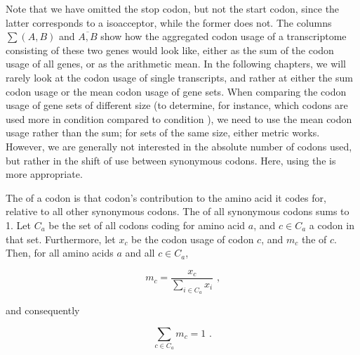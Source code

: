 Note that we have omitted the stop codon, but not the start codon, since the
latter corresponds to a \trna isoacceptor, while the former does not. The
columns \(\sum(A,B)\) and \(\overline{A,B}\) show how the aggregated codon usage
of a transcriptome consisting of these two genes would look like, either as the
sum of the codon usage of all genes, or as the arithmetic mean. In the following
chapters, we will rarely look at the codon usage of single transcripts, and
rather at either the sum codon usage or the mean codon usage of gene sets. When
comparing the codon usage of gene sets of different size (to determine, for
instance, which codons are used more in condition  compared to
condition ), we need to use the mean codon usage rather than the sum;
for sets of the same size, either metric works. However, we are generally not
interested in the absolute number of codons used, but rather in the shift of use
between synonymous codons. Here, using the \rcu is more appropriate.

The  of a codon is that codon’s
contribution to the amino acid it codes for, relative to all other synonymous
codons. The \rcu of all synonymous codons sums to \num{1}. Let \(C_a\) be the
set of all codons coding for amino acid \(a\), and \(c \in C_a\) a codon in that
set. Furthermore, let \(x_c\) be the codon usage of codon \(c\), and \(m_c\) the
\rcu of \(c\). Then, for all amino acids \(a\) and all \(c \in C_a\),

\begin{equation}
    m_c = \frac{x_c}{\sum_{i \in C_a} x_i} \text{\ ,}
\end{equation}

and consequently

\begin{equation}
    \sum_{c \in C_a} m_c = 1 \text{\ .}
\end{equation}

